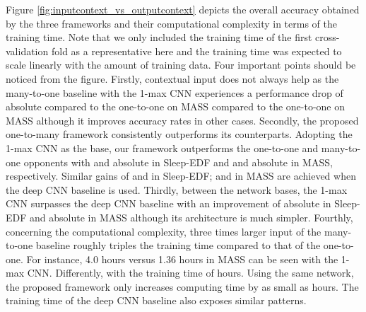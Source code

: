 \documentclass[10pt,twocolumn,twoside]{IEEEtran}
\begin{document}
Figure \ref{fig:inputcontext_vs_outputcontext} depicts the overall accuracy obtained by the three frameworks and their computational complexity in terms of the training time. Note that we only included the training time of the first cross-validation fold as a representative here and the training time was expected to scale linearly with the amount of training data. Four important points should be noticed from the figure. Firstly, contextual input does not always help as the many-to-one baseline with the 1-max CNN experiences a performance drop of  absolute compared to the one-to-one on MASS compared to the one-to-one on MASS although it improves accuracy rates in other cases. Secondly, the proposed one-to-many framework consistently outperforms its counterparts. Adopting the 1-max CNN as the base, our framework outperforms the one-to-one and many-to-one opponents with 
 and  absolute in Sleep-EDF and  and  absolute in MASS, respectively. Similar gains of  and  in Sleep-EDF;  and  in MASS are achieved when the deep CNN baseline is used.
Thirdly, between the network bases, the 1-max CNN surpasses the deep CNN baseline with an improvement of  absolute in Sleep-EDF and  absolute in MASS although its architecture is much simpler. 
Fourthly, concerning the computational complexity, three times larger input of the many-to-one baseline roughly triples the training time compared to that of the one-to-one. For instance, 4.0 hours versus 1.36 hours in MASS can be seen with the 1-max CNN. Differently, with the training time of  hours. Using the same network, the proposed framework only increases computing time by as small as  hours. The training time of the deep CNN baseline also exposes similar patterns. 
\end{document}
